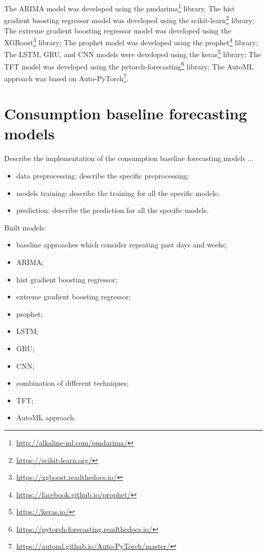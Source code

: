 The ARIMA model was developed using the pmdarima\footnote{ \url{http://alkaline-ml.com/pmdarima/} } library.
The hist gradient boosting regressor model was developed using the scikit-learn\footnote{ \url{https://scikit-learn.org/} } library;
The extreme gradient boosting regressor model was developed using the XGBoost\footnote{ \url{https://xgboost.readthedocs.io/} } library;
The prophet model was developed using the prophet\footnote{ \url{https://facebook.github.io/prophet/} } library;
The LSTM, GRU, and CNN models were developed using the keras\footnote{ \url{https://keras.io/} } library;
The TFT model was developed using the pytorch-forecasting\footnote{ \url{https://pytorch-forecasting.readthedocs.io/} } library;
The AutoML approach was based on Auto-PyTorch\footnote{ \url{https://automl.github.io/Auto-PyTorch/master/} }.


\section{Consumption baseline forecasting models}
\label{sec:baselineimpl}
\vspace{0.2 cm}

Describe the implementation of the consumption baseline forecasting models ...
\begin{itemize}
  \item data preprocessing: describe the specific preprocessing;
  \item models training: describe the training for all the specific models;
  \item prediction: describe the prediction for all the specific models.
\end{itemize}

Built models:
\begin{itemize}
  \item baseline approaches which consider repeating past days and weeks;
  \item ARIMA;
  \item hist gradient boosting regressor;
  \item extreme gradient boosting regressor;
  \item prophet;
  \item LSTM;
  \item GRU;
  \item CNN;
  \item combination of different techniques;
  \item TFT;
  \item AutoML approach.
\end{itemize}


